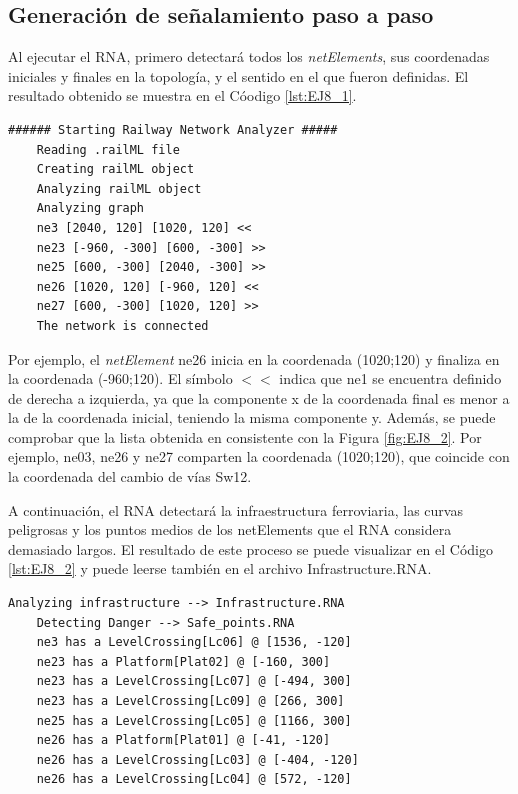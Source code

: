 \subsection{Generación de señalamiento paso a paso}

	Al ejecutar el RNA, primero detectará todos los \textit{netElements}, sus coordenadas iniciales y finales en la topología, y el sentido en el que fueron definidas. El resultado obtenido se muestra en el Cóodigo \ref{lst:EJ8_1}.
	
	\begin{lstlisting}[language = {}, caption = Detección de \textit{netElements} por parte del RNA , label = {lst:EJ8_1}]
	###### Starting Railway Network Analyzer #####
	Reading .railML file
	Creating railML object
	Analyzing railML object
	Analyzing graph
	ne3 [2040, 120] [1020, 120] <<
	ne23 [-960, -300] [600, -300] >>
	ne25 [600, -300] [2040, -300] >>
	ne26 [1020, 120] [-960, 120] <<
	ne27 [600, -300] [1020, 120] >>
	The network is connected
	\end{lstlisting}
	
	Por ejemplo, el \textit{netElement} ne26 inicia en la coordenada (1020;120) y finaliza en la coordenada (-960;120). El símbolo $<<$ indica que ne1 se encuentra definido de derecha a izquierda, ya que la componente x de la coordenada final es menor a la de la coordenada inicial, teniendo la misma componente y. Además, se puede comprobar que la lista obtenida en consistente con la Figura \ref{fig:EJ8_2}. Por ejemplo, ne03, ne26 y ne27 comparten la coordenada (1020;120), que coincide con la coordenada del cambio de vías Sw12.
	
	A continuación, el RNA detectará la infraestructura ferroviaria, las curvas peligrosas y los puntos medios de los netElements que el RNA considera demasiado largos. El resultado de este proceso se puede visualizar en el Código \ref{lst:EJ8_2} y puede leerse también en el archivo Infrastructure.RNA.
	
	\begin{lstlisting}[language = {}, caption = Detección de puntos críticos por parte del RNA , label = {lst:EJ8_2}]
	Analyzing infrastructure --> Infrastructure.RNA
	Detecting Danger --> Safe_points.RNA
	ne3 has a LevelCrossing[Lc06] @ [1536, -120]
	ne23 has a Platform[Plat02] @ [-160, 300]
	ne23 has a LevelCrossing[Lc07] @ [-494, 300]
	ne23 has a LevelCrossing[Lc09] @ [266, 300]
	ne25 has a LevelCrossing[Lc05] @ [1166, 300]
	ne26 has a Platform[Plat01] @ [-41, -120]
	ne26 has a LevelCrossing[Lc03] @ [-404, -120]
	ne26 has a LevelCrossing[Lc04] @ [572, -120]
	\end{lstlisting}
	
